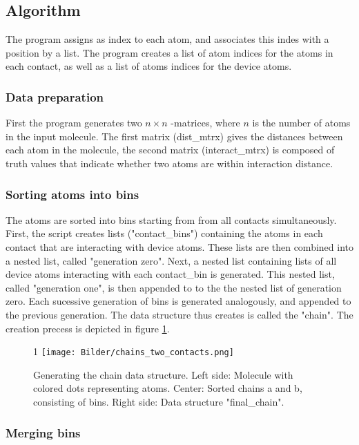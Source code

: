 \documentclass[11pt,a4paper]{article}
\begin{document}
\subsection{Algorithm}

The program assigns as index to each atom, and associates this indes with a position by a list. The program creates a list of atom indices for the atoms in each contact, as well as a list of atoms indices for the device atoms.

\subsubsection{Data preparation}
First the program generates two $n \times n$ -matrices, where $n$ is the number of atoms in the input molecule. The first matrix (dist\_mtrx) gives the distances between each atom in the molecule, the second matrix (interact\_mtrx) is composed of truth values that indicate whether two atoms are within interaction distance.

\subsubsection{Sorting atoms into bins}

The atoms are sorted into bins starting from from all contacts simultaneously. First, the script creates lists ("contact\_bins") containing the atoms in each contact that are interacting with device atoms. These lists are then combined into a nested list, called "generation zero". Next, a nested list containing lists of all device atoms interacting with each contact\_bin is generated. This nested list, called "generation one", is then appended to to the the nested list of generation zero. Each sucessive generation of bins is generated analogously, and appended to the previous generation. The data structure thus creates is called the "chain". The creation precess is depicted in figure \ref{fig:chains_two_contacts}.


\begin{figure}[h!]1
   \centering
   \texttt{[image: Bilder/chains\_two\_contacts.png]}
   \caption{Generating the chain data structure. Left side: Molecule with colored dots representing atoms. Center: Sorted chains a and b, consisting of bins. Right side: Data structure "final\_chain". }
   \label{fig:chains_two_contacts}
\end{figure}


\subsubsection{Merging bins}







\end{document}

